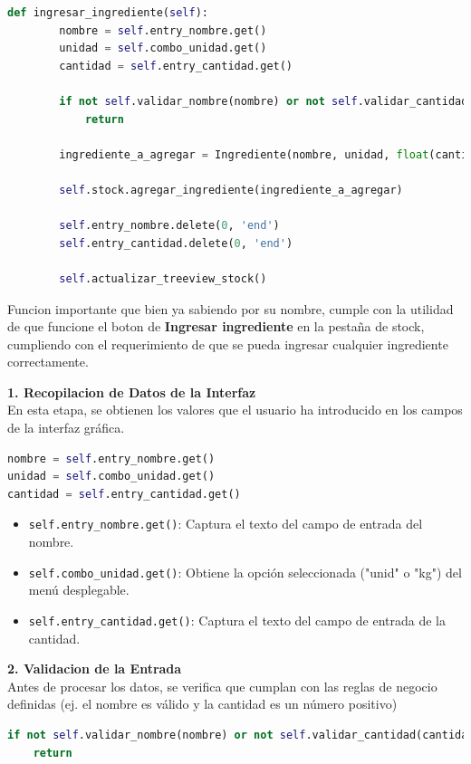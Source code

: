\documentclass[a4paper,12pt]{article}
\begin{document}
\newpage

\begin{lstlisting}[language=Python, caption={Implementaciones de codigo}, frame=single]
    def ingresar_ingrediente(self):
        nombre = self.entry_nombre.get()
        unidad = self.combo_unidad.get()
        cantidad = self.entry_cantidad.get()

        if not self.validar_nombre(nombre) or not self.validar_cantidad(cantidad):
            return

        ingrediente_a_agregar = Ingrediente(nombre, unidad, float(cantidad))

        self.stock.agregar_ingrediente(ingrediente_a_agregar)

        self.entry_nombre.delete(0, 'end')
        self.entry_cantidad.delete(0, 'end')

        self.actualizar_treeview_stock()
\end{lstlisting}
Funcion importante que bien ya sabiendo por su nombre, cumple con la utilidad de que funcione el boton de \textbf{Ingresar ingrediente} en la pestaña de stock, cumpliendo con el requerimiento de que se pueda ingresar cualquier ingrediente correctamente.

\textbf{1. Recopilacion de Datos de la Interfaz}\\
En esta etapa, se obtienen los valores que el usuario ha introducido en los campos de la interfaz gráfica.
\begin{lstlisting}[language=Python, caption={desenglosando codigo}, frame=single]
nombre = self.entry_nombre.get()
unidad = self.combo_unidad.get()
cantidad = self.entry_cantidad.get()
\end{lstlisting}
\begin{itemize} \item \verb|self.entry_nombre.get()|: Captura el texto del campo de entrada del nombre. \item \verb|self.combo_unidad.get()|: Obtiene la opción seleccionada ("unid" o "kg") del menú desplegable. \item \verb|self.entry_cantidad.get()|: Captura el texto del campo de entrada de la cantidad. 
\end{itemize}
\textbf{2. Validacion de la Entrada}\\
Antes de procesar los datos, se verifica que cumplan con las reglas de negocio definidas (ej. el nombre es válido y la cantidad es un número positivo)
\begin{lstlisting}[language=Python, caption={desenglosando codigo}, frame=single]
    if not self.validar_nombre(nombre) or not self.validar_cantidad(cantidad):
    return
\end{lstlisting}
\end{document}
